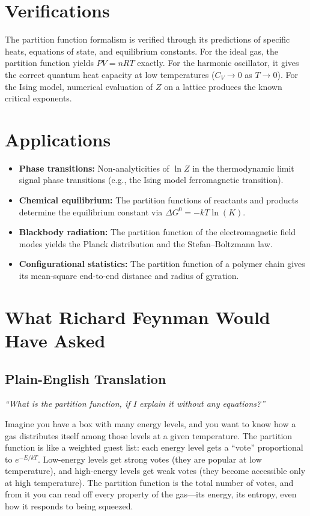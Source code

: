 \documentclass[11pt,openright]{book}
\begin{document}
\section*{Verifications}

The partition function formalism is verified through its predictions of specific heats, equations of state, and equilibrium constants. For the ideal gas, the partition function yields $PV = nRT$ exactly. For the harmonic oscillator, it gives the correct quantum heat capacity at low temperatures ($C_{V} \to 0$ as $T \to 0$). For the Ising model, numerical evaluation of $Z$ on a lattice produces the known critical exponents.
\section*{Applications}

\begin{itemize}
  \item \textbf{Phase transitions:} Non-analyticities of $\ln Z$ in the thermodynamic limit signal phase transitions (e.g., the Ising model ferromagnetic transition).
  \item \textbf{Chemical equilibrium:} The partition functions of reactants and products determine the equilibrium constant via $\Delta G^{0} = -kT\ln(K)$.
  \item \textbf{Blackbody radiation:} The partition function of the electromagnetic field modes yields the Planck distribution and the Stefan--Boltzmann law.
  \item \textbf{Configurational statistics:} The partition function of a polymer chain gives its mean-square end-to-end distance and radius of gyration.
\end{itemize}
\section*{What Richard Feynman Would Have Asked}

\subsection*{Plain-English Translation}
\textit{``What is the partition function, if I explain it without any equations?''}

Imagine you have a box with many energy levels, and you want to know how a gas distributes itself among those levels at a given temperature. The partition function is like a weighted guest list: each energy level gets a ``vote'' proportional to $e^{-E/kT}$. Low-energy levels get strong votes (they are popular at low temperature), and high-energy levels get weak votes (they become accessible only at high temperature). The partition function is the total number of votes, and from it you can read off every property of the gas---its energy, its entropy, even how it responds to being squeezed.
\end{document}
